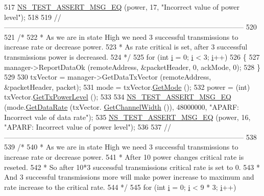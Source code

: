 \begin{DoxyCode}
517   \hyperlink{group__testing_ga2a9d78cffb3db8e867c35fff0b698cf5}{NS\_TEST\_ASSERT\_MSG\_EQ} (power, 17, \textcolor{stringliteral}{"Incorrect value of power level"});
518 
519   \textcolor{comment}{//-----------------------------------------------------------------------------------------------------}
520 
521   \textcolor{comment}{/*}
522 \textcolor{comment}{   * As we are in state High we need 3 successful transmissions to increase rate or decrease power.}
523 \textcolor{comment}{   * As rate critical is set, after 3 successful transmissions power is decreased.}
524 \textcolor{comment}{   */}
525   \textcolor{keywordflow}{for} (\textcolor{keywordtype}{int} \hyperlink{bernuolliDistribution_8m_a6f6ccfcf58b31cb6412107d9d5281426}{i} = 0; \hyperlink{bernuolliDistribution_8m_a6f6ccfcf58b31cb6412107d9d5281426}{i} < 3; \hyperlink{bernuolliDistribution_8m_a6f6ccfcf58b31cb6412107d9d5281426}{i}++)
526     \{
527       manager->ReportDataOk (remoteAddress, &packetHeader, 0, ackMode, 0);
528     \}
529 
530   txVector = manager->GetDataTxVector (remoteAddress, &packetHeader, packet);
531   mode = txVector.\hyperlink{classns3_1_1WifiTxVector_a497b1f11cad4b8b26251dfa07c9ad1d6}{GetMode} ();
532   power = (int) txVector.\hyperlink{classns3_1_1WifiTxVector_a7c98bd9609ff1c5cefa6e22d6908a2fe}{GetTxPowerLevel} ();
533 
534   \hyperlink{group__testing_ga2a9d78cffb3db8e867c35fff0b698cf5}{NS\_TEST\_ASSERT\_MSG\_EQ} (mode.\hyperlink{classns3_1_1WifiMode_adcfbe150f69da720db23387f733b8a52}{GetDataRate} (txVector.
      \hyperlink{classns3_1_1WifiTxVector_a1f8bfa51778a3e217581eb665f059564}{GetChannelWidth} ()), 48000000, \textcolor{stringliteral}{"APARF: Incorrect vale of data rate"});
535   \hyperlink{group__testing_ga2a9d78cffb3db8e867c35fff0b698cf5}{NS\_TEST\_ASSERT\_MSG\_EQ} (power, 16, \textcolor{stringliteral}{"APARF: Incorrect value of power level"});
536 
537   \textcolor{comment}{//-----------------------------------------------------------------------------------------------------}
538 
539   \textcolor{comment}{/*}
540 \textcolor{comment}{   * As we are in state High we need 3 successful transmissions to increase rate or decrease power.}
541 \textcolor{comment}{   * After 10 power changes critical rate is reseted.}
542 \textcolor{comment}{   * So after 10*3 successful transmissions critical rate is set to 0.}
543 \textcolor{comment}{   * And 3 successful transmissions more will make power increase to maximum and rate increase to the
       critical rate.}
544 \textcolor{comment}{   */}
545   \textcolor{keywordflow}{for} (\textcolor{keywordtype}{int} \hyperlink{bernuolliDistribution_8m_a6f6ccfcf58b31cb6412107d9d5281426}{i} = 0; \hyperlink{bernuolliDistribution_8m_a6f6ccfcf58b31cb6412107d9d5281426}{i} < 9 * 3; \hyperlink{bernuolliDistribution_8m_a6f6ccfcf58b31cb6412107d9d5281426}{i}++)

\end{DoxyCode}
